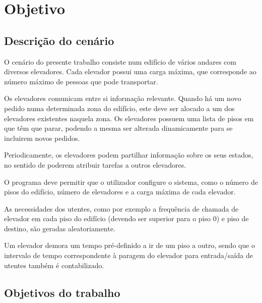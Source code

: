 ﻿\documentclass[a4paper]{article}
\begin{document}
\newpage

\tableofcontents



\newpage

\section{Objetivo}

\subsection{Descrição do cenário} 

O cenário do presente trabalho consiste num edifício de vários andares com diversos elevadores. Cada elevador possui uma carga máxima, que corresponde ao número máximo de pessoas que pode transportar.

Os elevadores comunicam entre si informação relevante. Quando há um novo pedido numa determinada zona do edifício, este deve ser alocado a um dos elevadores existentes naquela zona. Os elevadores possuem uma lista de pisos em que têm que parar, podendo a mesma ser alterada dinamicamente para se incluirem novos pedidos.

Periodicamente, os elevadores podem partilhar informação sobre os seus estados, no sentido de poderem atribuir tarefas a outros elevadores.

O programa deve permitir que o utilizador configure o sistema, como o número de pisos do edifício, número de elevadores e a carga máxima de cada elevador.

As necessidades dos utentes, como por exemplo a frequência de chamada de elevador em cada piso do edifício (devendo ser superior para o piso 0) e piso de destino, são geradas aleatoriamente. 

Um elevador demora um tempo pré-definido a ir de um piso a outro, sendo que o intervalo de tempo correspondente à paragem do elevador para entrada/saída de utentes também é contabilizado.

\subsection{Objetivos do trabalho} 
\end{document}
